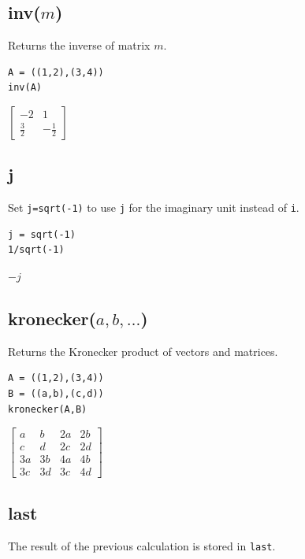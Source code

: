 \documentclass[12pt]{article}
\begin{document}
\subsection*{inv($m$)}

Returns the inverse of matrix $m$.

{\color{blue}
\begin{verbatim}
A = ((1,2),(3,4))
inv(A)
\end{verbatim}
}

\noindent
$\displaystyle
\begin{bmatrix}
-2 & 1
\\[1ex]
\tfrac{3}{2} & -\tfrac{1}{2}
\end{bmatrix}
$

\subsection*{j}

Set {\tt j=sqrt(-1)} to use {\tt j} for the imaginary unit instead of {\tt i}.

{\color{blue}
\begin{verbatim}
j = sqrt(-1)
1/sqrt(-1)
\end{verbatim}
}

\noindent
$-j$

\subsection*{kronecker($a,b,\ldots$)}

Returns the Kronecker product of vectors and matrices.

{\color{blue}
\begin{verbatim}
A = ((1,2),(3,4))
B = ((a,b),(c,d))
kronecker(A,B)
\end{verbatim}
}

\noindent
$\displaystyle
\begin{bmatrix}
a & b & 2a & 2b
\\[1ex]
c & d & 2c & 2d
\\[1ex]
3a & 3b & 4a & 4b
\\[1ex]
3c & 3d & 3c & 4d
\end{bmatrix}
$

\subsection*{last}

The result of the previous calculation is stored in {\tt last}.
\end{document}
